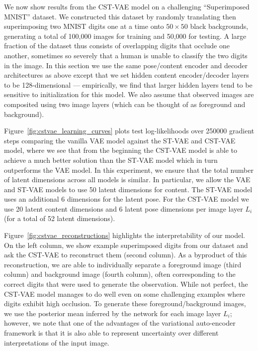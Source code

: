 
We now show results from the CST-VAE model on a challenging ``Superimposed MNIST'' dataset.
We constructed this dataset
by randomly translating then superimposing two MNIST digits one at a time onto $50\times 50$ black backgrounds,
generating a total of 100,000 images for training and 50,000 for testing.  
A large fraction of the dataset thus consists of overlapping digits that occlude one another, sometimes so severely that
a human is unable to classify the two digits in the image.
In this section we use the same pose/content encoder and decoder
architectures as above except that we set hidden content encoder/decoder layers to be 128-dimensional --- empirically,
we find that larger hidden layers tend to be sensitive to initialization for this model.
We also assume that observed images are composited
using two image layers (which can be thought of as foreground and background).

Figure~\ref{fig:cstvae_learning_curves}
plots test log-likelihoods over 250000 gradient steps
comparing the vanilla VAE model against the ST-VAE and CST-VAE model, where 
we see that from the beginning the CST-VAE
model is able to achieve a much better solution than the ST-VAE model
which in turn outperforms the VAE model.   
In this experiment, we ensure that the total number of latent dimensions across all
models is similar.
In particular, 
we allow the VAE and ST-VAE models to use 50 latent dimensions for content.
The ST-VAE model uses an additional 6 dimensions for the latent pose.
For the CST-VAE model we use 20 latent content dimensions
and 6 latent pose dimensions per image layer $L_i$ (for a total of 52 latent dimensions). 


Figure~\ref{fig:cstvae_reconstructions} highlights the interpretability of our model.
On the left column, we show example superimposed digits from our dataset and ask the 
CST-VAE to reconstruct them (second column).  As a byproduct of this reconstruction,
we are able to individually separate a foreground image (third column) and background image (fourth column),
often corresponding to the correct digits that were used to generate the observation.  
 While not perfect, the CST-VAE model manages to do well even on some challenging examples where
 digits exhibit high occlusion.  To generate these foreground/background images, we use the posterior mean
 inferred by the network for each image layer $L_i$; however, we note that one of the advantages of the 
 variational auto-encoder framework is that it is also able to represent uncertainty over different interpretations
 of the input image.

